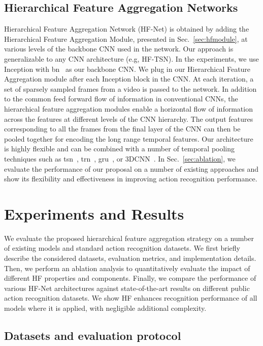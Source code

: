 \documentclass[journal,onecolumn]{IEEEtran}
\begin{document}
\subsection{Hierarchical Feature Aggregation Networks}
\label{sec:hfanet}
Hierarchical Feature Aggregation Network (HF-Net) is obtained by adding the Hierarchical Feature Aggregation Module, presented in Sec.~\ref{sec:hfmodule}, at various levels of the backbone CNN used in the network. 
Our approach is generalizable to any CNN architecture (e.g, HF-TSN). In the experiments, we use Inception with \ac{bn}~\cite{inception_bn} as our backbone CNN. We plug in our Hierarchical Feature Aggregation module after each Inception block in the CNN. At each iteration, a set of sparsely sampled frames  from a video is passed to the network. In addition to the common feed forward flow of information in conventional CNNs, the hierarchical feature aggregation modules enable a horizontal flow of information across the features at different levels of the CNN hierarchy. The output features corresponding to all the frames from the final layer of the CNN can then be pooled together for encoding the long range temporal features. Our architecture is highly flexible and can be combined with a number of temporal pooling techniques such as \ac{tsn}~\cite{tsn}, \ac{trn}~\cite{trn}, \ac{gru}~\cite{dwibedi2018temporal}, or 3DCNN~\cite{eco}. In Sec.~\ref{sec:ablation}, we evaluate the performance of our proposal on a number of existing approaches and show its flexibility and effectiveness in improving action recognition performance. 



\section{Experiments and Results}
\label{sec:results}
We evaluate the proposed hierarchical feature aggregation strategy on a number of existing models and standard action recognition datasets. We first briefly describe the considered datasets, evaluation metrics, and implementation details. Then, we perform an ablation analysis to quantitatively evaluate the impact of different HF properties and components. Finally, we compare the performance of various HF-Net architectures against state-of-the-art results on different public action recognition datasets. We show HF enhances recognition performance of all models where it is applied, with negligible additional complexity.

\subsection{Datasets and evaluation protocol}
\end{document}
